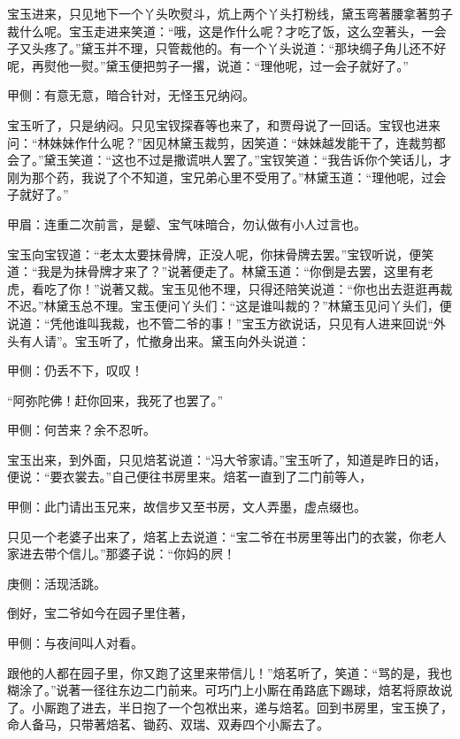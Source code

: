 \begin{parag}
    宝玉进来，只见地下一个丫头吹熨斗，炕上两个丫头打粉线，黛玉弯著腰拿著剪子裁什么呢。宝玉走进来笑道：“哦，这是作什么呢？才吃了饭，这么空著头，一会子又头疼了。”黛玉并不理，只管裁他的。有一个丫头说道：“那块绸子角儿还不好呢，再熨他一熨。”黛玉便把剪子一撂，说道：“理他呢，过一会子就好了。”\begin{note}甲侧：有意无意，暗合针对，无怪玉兄纳闷。\end{note}宝玉听了，只是纳闷。只见宝钗探春等也来了，和贾母说了一回话。宝钗也进来问：“林妹妹作什么呢？”因见林黛玉裁剪，因笑道：“妹妹越发能干了，连裁剪都会了。”黛玉笑道：“这也不过是撒谎哄人罢了。”宝钗笑道：“我告诉你个笑话儿，才刚为那个药，我说了个不知道，宝兄弟心里不受用了。”林黛玉道：“理他呢，过会子就好了。”\begin{note}甲眉：连重二次前言，是颦、宝气味暗合，勿认做有小人过言也。\end{note}宝玉向宝钗道：“老太太要抹骨牌，正没人呢，你抹骨牌去罢。”宝钗听说，便笑道：“我是为抹骨牌才来了？”说著便走了。林黛玉道：“你倒是去罢，这里有老虎，看吃了你！”说著又裁。宝玉见他不理，只得还陪笑说道：“你也出去逛逛再裁不迟。”林黛玉总不理。宝玉便问丫头们：“这是谁叫裁的？”林黛玉见问丫头们，便说道：“凭他谁叫我裁，也不管二爷的事！”宝玉方欲说话，只见有人进来回说“外头有人请”。宝玉听了，忙撤身出来。黛玉向外头说道：\begin{note}甲侧：仍丢不下，叹叹！\end{note}“阿弥陀佛！赶你回来，我死了也罢了。”\begin{note}甲侧：何苦来？余不忍听。\end{note}
\end{parag}


\begin{parag}
    宝玉出来，到外面，只见焙茗说道：“冯大爷家请。”宝玉听了，知道是昨日的话，便说：“要衣裳去。”自己便往书房里来。焙茗一直到了二门前等人，\begin{note}甲侧：此门请出玉兄来，故信步又至书房，文人弄墨，虚点缀也。\end{note}只见一个老婆子出来了，焙茗上去说道：“宝二爷在书房里等出门的衣裳，你老人家进去带个信儿。”那婆子说：“你妈的屄！\begin{note}庚侧：活现活跳。\end{note}倒好，宝二爷如今在园子里住著，\begin{note}甲侧：与夜间叫人对看。\end{note}跟他的人都在园子里，你又跑了这里来带信儿！”焙茗听了，笑道：“骂的是，我也糊涂了。”说著一径往东边二门前来。可巧门上小厮在甬路底下踢球，焙茗将原故说了。小厮跑了进去，半日抱了一个包袱出来，递与焙茗。回到书房里，宝玉换了，命人备马，只带著焙茗、锄药、双瑞、双寿四个小厮去了。
\end{parag}



